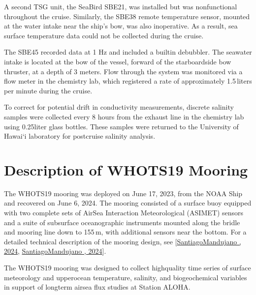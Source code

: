 \documentclass[a4paper,10pt,english,openany,oneside]{sphinxmanual}
\begin{document}
\sphinxAtStartPar
A second TSG unit, the Sea\sphinxhyphen{}Bird SBE\sphinxhyphen{}21, was installed but was non\sphinxhyphen{}functional
throughout the cruise. Similarly, the SBE\sphinxhyphen{}38 remote temperature sensor, mounted
at the water intake near the ship’s bow, was also inoperative. As a result, sea
surface temperature data could not be collected during the cruise.

\sphinxAtStartPar
The SBE\sphinxhyphen{}45 recorded data at 1 Hz and included a built\sphinxhyphen{}in debubbler. The
seawater intake is located at the bow of the vessel, forward of the
starboard\sphinxhyphen{}side bow thruster, at a depth of 3 meters. Flow through the system
was monitored via a flow meter in the chemistry lab, which registered a rate of
approximately 1.5 liters per minute during the cruise.

\sphinxAtStartPar
To correct for potential drift in conductivity measurements, discrete salinity
samples were collected every 8 hours from the exhaust line in the chemistry lab
using 0.25\sphinxhyphen{}liter glass bottles. These samples were returned to the University
of Hawai‘i laboratory for post\sphinxhyphen{}cruise salinity analysis.


\chapter{Description of WHOTS\sphinxhyphen{}19 Mooring}
\label{\detokenize{3_section:description-of-whots-19-mooring}}\label{\detokenize{3_section::doc}}
\sphinxAtStartPar
The WHOTS\sphinxhyphen{}19 mooring was deployed on June 17, 2023, from the NOAA Ship  and recovered on June 6, 2024. The mooring consisted of a surface
buoy equipped with two complete sets of Air\textendash{}Sea Interaction Meteorological
(ASIMET) sensors and a suite of subsurface oceanographic instruments mounted
along the bridle and mooring line down to 155 m, with additional sensors near
the bottom. For a detailed technical description of the mooring design, see
{[}\hyperlink{cite.references:id17}{Santiago\sphinxhyphen{}Mandujano , 2024}, \hyperlink{cite.references:id18}{Santiago\sphinxhyphen{}Mandujano , 2024}{]}.

\sphinxAtStartPar
The WHOTS\sphinxhyphen{}19 mooring was designed to collect high\sphinxhyphen{}quality time series of
surface meteorology and upper\sphinxhyphen{}ocean temperature, salinity, and biogeochemical
variables in support of long\sphinxhyphen{}term air\sphinxhyphen{}sea flux studies at Station ALOHA.
\end{document}

